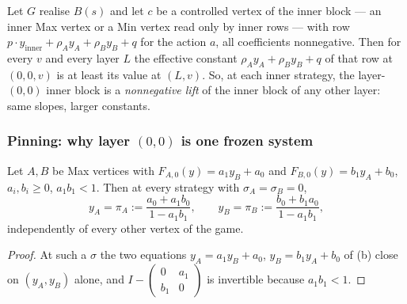 \begin{corollary}\label{lvl:drive-nonneg}
Let $G$ realise $B(s)$ and let $c$ be a controlled vertex of the inner block
--- an inner Max vertex or a Min vertex read only by inner rows --- with row
$p\cdot y_{\mathrm{inner}}+\rho_A y_A+\rho_B y_B+q$ for the action $a$, all
coefficients nonnegative.  Then for every $v$ and every layer $L$ the effective
constant $\rho_Ay_A+\rho_By_B+q$ of that row at $(0,0,v)$ is at least its value
at $(L,v)$.  So, at each inner strategy, the layer-$(0,0)$ inner block is a
\emph{nonnegative lift} of the inner block of any other layer: same slopes,
larger constants.
\end{corollary}

\subsubsection*{Pinning: why layer $(0,0)$ is one frozen system}

\begin{lemma}\label{lvl:pin}
Let $A,B$ be Max vertices with $F_{A,0}(y)=a_1y_B+a_0$ and
$F_{B,0}(y)=b_1y_A+b_0$, $a_i,b_i\ge0$, $a_1b_1<1$.  Then at every strategy
with $\sigma_A=\sigma_B=0$,
\[
  y_A=\pi_A:=\frac{a_0+a_1b_0}{1-a_1b_1},\qquad
  y_B=\pi_B:=\frac{b_0+b_1a_0}{1-a_1b_1},
\]
independently of every other vertex of the game.
\end{lemma}

\begin{proof}
At such a $\sigma$ the two equations $y_A=a_1y_B+a_0$, $y_B=b_1y_A+b_0$ of
(b) close on $(y_A,y_B)$ alone, and $I-\left(\begin{smallmatrix}0&a_1\\
b_1&0\end{smallmatrix}\right)$ is invertible because $a_1b_1<1$.
\end{proof}

